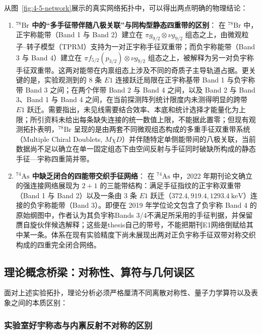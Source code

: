 从图~\ref{fig:4-5-network}展示的真实网络拓扑中，可以得出两点明确的物理结论：
\begin{enumerate}
\item \textbf{$^{78}\mathrm{Br}$ 中的“多手征带伴随八极关联”与同构型静态四重带的区别}：
在 $^{78}\mathrm{Br}$ 中，正宇称能带（Band 1 与 Band 2）建立在 $\pi g_{9/2} \otimes \nu g_{9/2}$ 组态之上，由微观粒子--转子模型（TPRM）支持为一对正宇称手征双重带；而负宇称能带（Band 3 与 Band 4）建立在 $\pi f_{5/2}(p_{3/2}) \otimes \nu g_{9/2}$ 组态之上，被解释为另一对负宇称手征双重带。这两对能带在内禀组态上涉及不同的奇质子主导轨道占据。更关键的是，实验观测到的 8 条 $E1$ 连接跃迁局限在正宇称基带 Band 1 与负宇称带 Band 3 之间；在两个伴带 Band 2 与 Band 4 之间，以及 Band 2 与 Band 3、Band 1 与 Band 4 之间，在当前探测阵列统计限度内未测得明显的跨带 $E1$ 跃迁。需要指出，未见线需要结合效率、本底和统计选择才能量化为上限；所引资料未给出每条缺失连接的统一数值上限，不能据此置零；但现有观测拓扑表明，$^{78}\mathrm{Br}$ 呈现的是由两套不同微观组态构成的多重手征双重带系统（Multiple Chiral Doublets, $M\chi D$）并伴随特定单侧能带间的八极关联，当前数据尚不足以确立在单一固定组态下由空间反射与手征同时破缺所构成的静态手征---宇称四重简并带。
\item \textbf{$^{74}\mathrm{As}$ 中缺乏闭合的四能带交织手征网络}：
在 $^{74}\mathrm{As}$ 中，2022 年期刊论文确立的强连接网络展现为 $2+1$ 的三能带结构：满足手征指纹的正宇称双重带（Band 1 与 Band 2）以及一条由 3 条 $E1$ 跃迁（$372.4, 919.4, 1293.4\ \mathrm{keV}$）连接的负宇称能带（Band 3）。即便在 2019 年学位论文包含了负宇称 Band 4 的原始纲图中，作者认为其负宇称Bands 3/4不满足所采用的手征判据，并保留赝自旋伙伴候选解释；这些是thesis自己的带号，不能把期刊E1网络倒赋给其中某一条。体系在现有实验精度下尚未展现出两对正负宇称手征双带对称交织构成的四重完全闭合网络。
\end{enumerate}

\subsection{理论概念桥梁：对称性、算符与几何误区}\label{sec:4-5-3}

面对上述实验拓扑，理论分析必须严格厘清不同离散对称性、量子力学算符以及表象之间的本质区别：

\subsubsection{实验室好宇称态与内禀反射不对称的区别}

